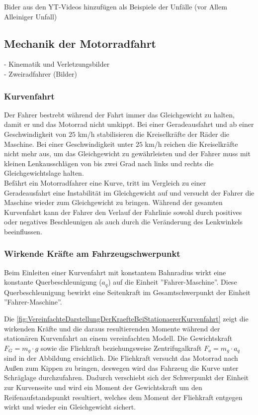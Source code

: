 Bider aus den YT-Videos hinzufügen als Beispiele der Unfälle (vor Allem Alleiniger Unfall)


\subsection{Mechanik der Motorradfahrt} %
- Kinematik und Verletzungsbilder\\
- Zweiradfahrer (Bilder)

\subsubsection{Kurvenfahrt} 

Der Fahrer bestrebt während der Fahrt immer das Gleichgewicht zu halten, damit er und das Motorrad nicht umkippt. Bei einer Geradeausfahrt und ab einer Geschwindigkeit von $25$ km/h stabilisieren die Kreiselkräfte der Räder die Maschine. Bei einer Geschwindigkeit unter $25$ km/h reichen die Kreiselkräfte nicht mehr aus, um das Gleichgewicht zu gewährleisten und der Fahrer muss mit kleinen Lenkausschlägen von bis zwei Grad nach links und rechts die Gleichgewichtslage halten.\\
Befährt ein Motorradfahrer eine Kurve, tritt im Vergleich zu einer Geradeausfahrt eine Instabilität im Gleichgewicht auf und versucht der Fahrer die Maschine wieder zum Gleichgewicht zu bringen. Während der gesamten Kurvenfahrt kann der Fahrer den Verlauf der Fahrlinie sowohl durch positives oder negatives Beschleunigen als auch durch die Veränderung des Lenkwinkels beeinflussen. \citep{Haedrich2012} 


\subsubsection{Wirkende Kräfte am Fahrzeugschwerpunkt}

Beim Einleiten einer Kurvenfahrt mit konstantem Bahnradius wirkt eine konstante Querbeschleunigung ($a_q$) auf die Einheit ''Fahrer-Maschine''. Diese Querbeschleunigung bewirkt eine Seitenkraft im Gesamtschwerpunkt der Einheit ''Fahrer-Maschine''. %

Die \autoref{fig:VereinfachteDarstellungDerKraefteBeiStationaererKurvenfahrt} zeigt die wirkenden Kräfte und die daraus resultierenden Momente während der stationären Kurvenfahrt an einem vereinfachten Modell. Die Gewichtskraft $F_G = m_g \cdot g$ sowie die Fliehkraft beziehungsweise Zentrifugalkraft $F_a = m_g \cdot a_q$ sind in der Abbildung ersichtlich. Die Fliehkraft versucht das Motorrad nach Außen zum Kippen zu bringen, deswegen wird das Fahrzeug die Kurve unter Schräglage durchzufahren. Dadurch verschiebt sich der Schwerpunkt der Einheit zur Kurvenseite und wird ein Moment der Gewichtskraft um den Reifenaufstandspunkt resultiert, welches dem Moment der Fliehkraft entgegen wirkt und wieder ein Gleichgewicht sichert.

